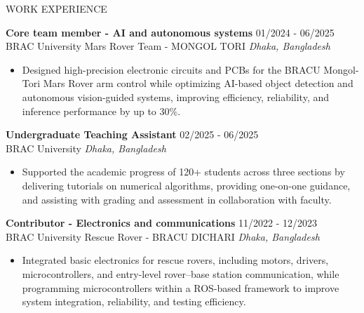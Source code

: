 \documentclass{resume} %
\begin{document}
\begin{rSection}{WORK EXPERIENCE}

\textbf{Core team member - AI and autonomous systems} \hfill 01/2024 - 06/2025\\
BRAC University Mars Rover Team - MONGOL TORI \hfill \textit{Dhaka, Bangladesh}
 \begin{itemize}
    \itemsep -3pt {}
     \item Designed high-precision electronic circuits and PCBs for the BRACU Mongol-Tori Mars Rover arm control while optimizing AI-based object detection and autonomous vision-guided systems, improving efficiency, reliability, and inference performance by up to 30\%.
 \end{itemize}

\textbf{Undergraduate Teaching Assistant} \hfill 02/2025 - 06/2025\\
BRAC University \hfill \textit{Dhaka, Bangladesh}
 \begin{itemize}
    \itemsep -3pt {}
     \item Supported the academic progress of 120+ students across three sections by delivering tutorials on numerical algorithms, providing one-on-one guidance, and assisting with grading and assessment in collaboration with faculty.
 \end{itemize}

\textbf{Contributor - Electronics and communications} \hfill 11/2022 - 12/2023\\
BRAC University Rescue Rover - BRACU DICHARI \hfill \textit{Dhaka, Bangladesh}
 \begin{itemize}
    \itemsep -3pt {}
     \item Integrated basic electronics for rescue rovers, including motors, drivers, microcontrollers, and entry-level rover--base station communication, while programming microcontrollers within a ROS-based framework to improve system integration, reliability, and testing efficiency.
 \end{itemize}

\end{rSection}

\end{document}

